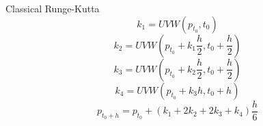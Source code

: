Classical Runge-Kutta
\begin{equation}
	k_1 = UVW(p_{t_0}, t_0)
\end{equation}
\begin{equation}
	k_2 = UVW(p_{t_0} + k_1 \frac{h}{2}, t_0 + \frac{h}{2})
\end{equation}
\begin{equation}
	k_3 = UVW(p_{t_0} + k_2 \frac{h}{2}, t_0 + \frac{h}{2})
\end{equation}
\begin{equation}
	k_4 = UVW(p_{t_0} + k_3 h, t_0 + h)
\end{equation}
\begin{equation}
	p_{t_0 + h} = p_{t_0} + (k_1 + 2 k_2 + 2 k_3 + k_4) \frac{h}{6}
\end{equation}

